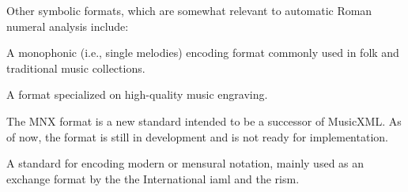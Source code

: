 

Other symbolic formats, which are somewhat relevant to automatic Roman numeral analysis include:


A monophonic (i.e., single melodies) encoding format commonly used in folk and traditional music collections.


A format specialized on high-quality music engraving.



The MNX format is a new standard intended to be a successor of MusicXML. As of now, the format is still in development and is not ready for implementation.


A standard for encoding modern or mensural notation, mainly used as an exchange format by the the International \gls{iaml} and the \gls{rism}.
